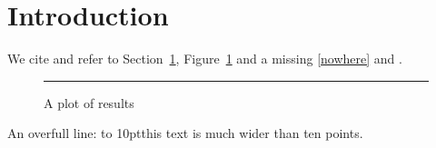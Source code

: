 \documentclass{article}
\begin{document}
\section{Introduction}\label{sec:intro}
We cite \cite{knuth1984} and refer to Section~\ref{sec:intro}, Figure~\ref{fig:plot}
and a missing \ref{nowhere} and \cite{nobody2020}.

\begin{figure}[h]
  \centering
  \rule{2cm}{1cm}
  \caption{A plot of results}
  \label{fig:plot}
\end{figure}



An overfull line: \hbox to 10pt{this text is much wider than ten points}.



\end{document}
